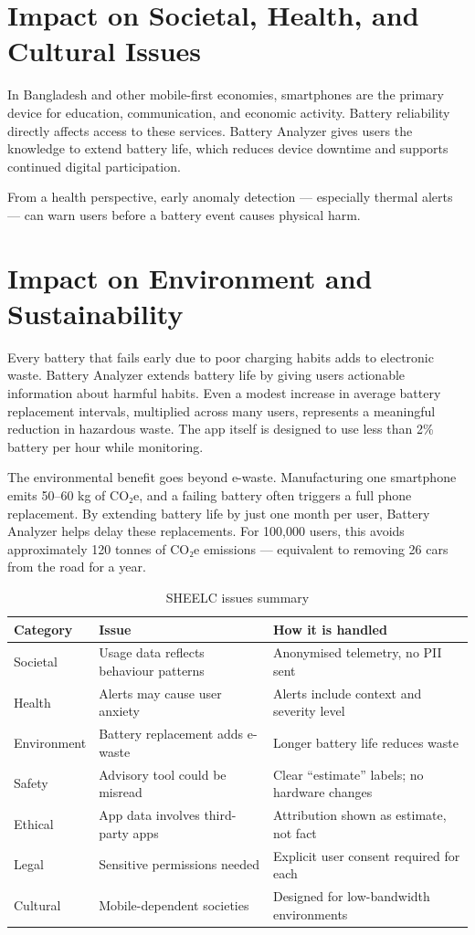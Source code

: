 \documentclass[12pt,a4paper]{report}
\begin{document}
\section{Impact on Societal, Health, and Cultural Issues}

In Bangladesh and other mobile-first economies, smartphones are the primary device
for education, communication, and economic activity. Battery reliability directly
affects access to these services. Battery Analyzer gives users the knowledge to
extend battery life, which reduces device downtime and supports continued digital
participation.

From a health perspective, early anomaly detection — especially thermal alerts —
can warn users before a battery event causes physical harm.

\section{Impact on Environment and Sustainability}

Every battery that fails early due to poor charging habits adds to electronic waste.
Battery Analyzer extends battery life by giving users actionable information about
harmful habits. Even a modest increase in average battery replacement intervals,
multiplied across many users, represents a meaningful reduction in hazardous waste.
The app itself is designed to use less than 2\% battery per hour while monitoring.

The environmental benefit goes beyond e-waste. Manufacturing one smartphone emits 50--60 kg of CO₂e, and a failing battery often triggers a full phone replacement. By extending battery life by just one month per user, Battery Analyzer helps delay these replacements. For 100,000 users, this avoids approximately 120 tonnes of CO₂e emissions — equivalent to removing 26 cars from the road for a year.

\begin{table}[H]
\caption{SHEELC issues summary}
\centering
\small
\begin{tabular}{lll}
\toprule
\textbf{Category} & \textbf{Issue} & \textbf{How it is handled}\\
\midrule
Societal    & Usage data reflects behaviour patterns & Anonymised telemetry, no PII sent\\
Health      & Alerts may cause user anxiety          & Alerts include context and severity level\\
Environment & Battery replacement adds e-waste       & Longer battery life reduces waste\\
Safety      & Advisory tool could be misread         & Clear ``estimate'' labels; no hardware changes\\
Ethical     & App data involves third-party apps     & Attribution shown as estimate, not fact\\
Legal       & Sensitive permissions needed           & Explicit user consent required for each\\
Cultural    & Mobile-dependent societies             & Designed for low-bandwidth environments\\
\bottomrule
\end{tabular}
\end{table}
\end{document}
